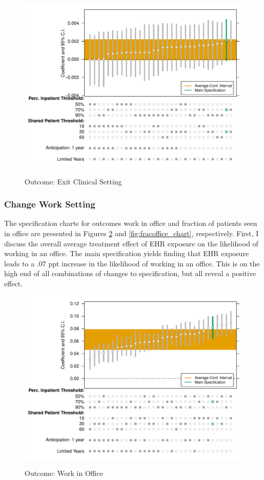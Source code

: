 \documentclass[12pt]{article}
\begin{document}
\begin{figure}[ht]
    \caption{Outcome: Exit Clinical Setting}
    \includegraphics[scale=.7]{Objects/retire_chart.pdf}
    \label{fig:retire_chart}
\end{figure}

\subsubsection{Change Work Setting}

The specification charts for outcomes work in office and fraction of patients seen in office are presented in Figures \ref{fig:work_chart} and \ref{fig:fracoffice_chart}, respectively. First, I discuss the overall average treatment effect of EHR exposure on the likelihood of working in an office. The main specification yields finding that EHR exposure leads to a .07 ppt increase in the likelihood of working in an office. This is on the high end of all combinations of changes to specification, but all reveal a positive effect.   

\begin{figure}[ht]
    \caption{Outcome: Work in Office}
    \includegraphics[scale=.7]{Objects/office_ind_chart.pdf}
    \label{fig:work_chart}
\end{figure}
\end{document}
